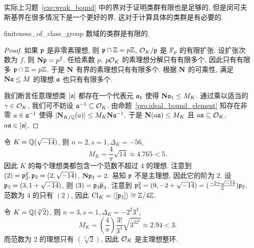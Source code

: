 \begin{remark}
实际上习题~\ref{exe:weak_bound} 中的界对于证明类群有限也是足够的, 但是闵可夫斯基界在很多情况下是一个更好的界, 这对于计算具体的类群是有必要的.
\end{remark}

\begin{theorem}{}{finiteness_of_class_group}
数域的类群是有限的.
\end{theorem}
\begin{proof}
如果 ${\mathfrak{p}}$ 是非零素理想, 则 ${\mathfrak{p}}\cap {\mathbb{Z}}=p{\mathbb{Z}}$, ${\mathcal{O}}_K/{\mathfrak{p}}$ 是 ${\mathbb{F}}_p$ 的有限扩张. 设扩张次数为 $f$, 则 ${\mathbf{N}}{\mathfrak{p}}=p^f$. 任给素数 $p$, $p{\mathcal{O}}_K$ 的素理想分解只有有限多个, 因此只有有限多 ${\mathfrak{p}}\cap {\mathbb{Z}}=p{\mathbb{Z}}$. 于是 ${\mathbf{N}}$ 有界的素理想只有有限多个. 根据 ${\mathbf{N}}$ 的可乘性, 满足 ${\mathbf{N}}{\mathfrak{a}}\le M$ 的理想 ${\mathfrak{a}}$ 也只有有限多个.

我们断言任意理想类 $[{\mathfrak{a}}]$ 都存在一个代表元 ${\mathfrak{a}}_1$ 使得 ${\mathbf{N}}{\mathfrak{a}}_1\le M_K$.
通过乘以适当的 $\gamma\in{\mathcal{O}}_K$, 我们可不妨设 ${\mathfrak{a}}^{-1}\subseteq {\mathcal{O}}_K$. 由命题~\ref{pro:ideal_bound_element} 知存在非零 $a\in{\mathfrak{a}}^{-1}$ 使得 $|{\mathbf{N}}_{K/{\mathbb{Q}}}(a)|\le M_K{\mathbf{N}}{\mathfrak{a}}^{-1}.$
于是 ${\mathbf{N}}(a{\mathfrak{a}})\le M_K$ 且 $a{\mathfrak{a}}\subseteq {\mathcal{O}}_K$, $a{\mathfrak{a}}\in[{\mathfrak{a}}]$.
\end{proof}

\begin{example}
令 $K={\mathbb{Q}}(\sqrt{-14})$, 则 $n=2, s=1,\Delta_K=-56$, 
	\[M_K=\frac{4}{\pi}\sqrt{14}\approx 4.765<5.\]
因此 $K$ 的每个理想类都包含一个范数不超过 $4$ 的理想. 注意到 $(2)={\mathfrak{p}}_2^2,{\mathfrak{p}}_2=(2,\sqrt{-14})$, ${\mathbf{N}}{\mathfrak{p}}_2=2.$ 易知 ${\mathfrak{p}}$ 不是主理想, 因此它的阶为 $2$. 设 ${\mathfrak{p}}_3=(3,1+\sqrt{-14})$, 则 $(3)={\mathfrak{p}}_3\overline {{\mathfrak{p}}}_3$. 注意到 ${\mathfrak{p}}_3^2=(9,-2+\sqrt{-14})=(\frac{-2+\sqrt{-14}}{2}){\mathfrak{p}}_2$. 范数为 $4$ 的只有 $(2)$, 因此 ${\mathrm{Cl}}_K=\langle{[{\mathfrak{p}}_3]}\rangle\cong{\mathbb{Z}}/4{\mathbb{Z}}$.
\end{example}
\begin{example}
令 $K={\mathbb{Q}}(\sqrt[3]2)$, 则 $n=3, s=1, \Delta_K=-2^2 3^3$,
	\[M_K=\left(\frac{4}{\pi}\right)\frac{3!}{3^3}\sqrt{3^32^2}\approx 2.94<3.\]
而范数为 $2$ 的理想只有 $(\sqrt[3]{2})$, 因此 ${\mathcal{O}}_K$ 是主理想整环.
\end{example}

